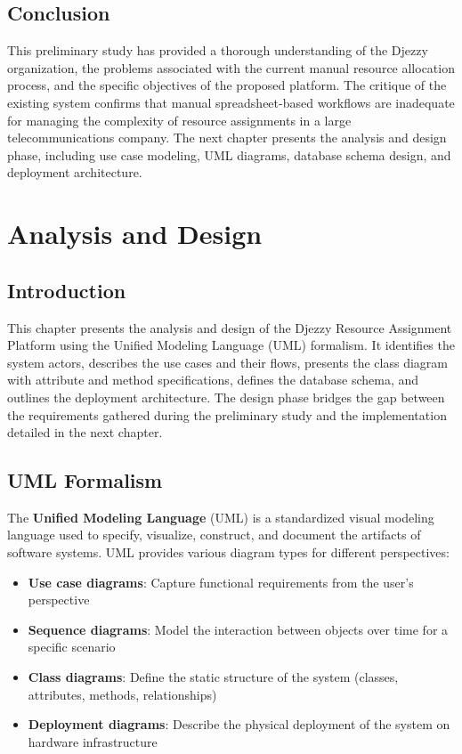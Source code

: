 \documentclass{bts-report}
\begin{document}
\section*{Conclusion}
This preliminary study has provided a thorough understanding of the Djezzy organization, the problems associated with the current manual resource allocation process, and the specific objectives of the proposed platform. The critique of the existing system confirms that manual spreadsheet-based workflows are inadequate for managing the complexity of resource assignments in a large telecommunications company. The next chapter presents the analysis and design phase, including use case modeling, UML diagrams, database schema design, and deployment architecture.

\chapter{Analysis and Design}

\section*{Introduction}
This chapter presents the analysis and design of the Djezzy Resource Assignment Platform using the Unified Modeling Language (UML) formalism. It identifies the system actors, describes the use cases and their flows, presents the class diagram with attribute and method specifications, defines the database schema, and outlines the deployment architecture. The design phase bridges the gap between the requirements gathered during the preliminary study and the implementation detailed in the next chapter.

\section{UML Formalism}

The \textbf{Unified Modeling Language} (UML) is a standardized visual modeling language used to specify, visualize, construct, and document the artifacts of software systems. UML provides various diagram types for different perspectives:

\begin{itemize}
  \item \textbf{Use case diagrams}: Capture functional requirements from the user's perspective
  \item \textbf{Sequence diagrams}: Model the interaction between objects over time for a specific scenario
  \item \textbf{Class diagrams}: Define the static structure of the system (classes, attributes, methods, relationships)
  \item \textbf{Deployment diagrams}: Describe the physical deployment of the system on hardware infrastructure
\end{itemize}
\end{document}
